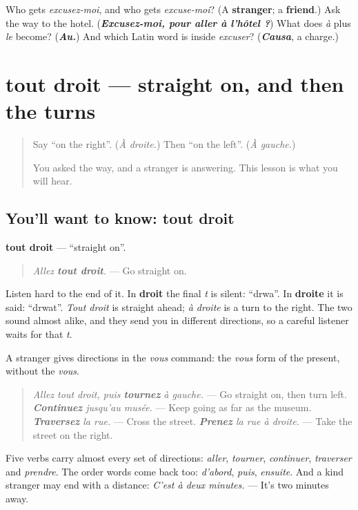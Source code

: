 \begin{tcolorbox}[breakable,colback=teal!4,colframe=teal!35!black,title={Before you move on}]
Who gets \emph{excusez-moi}, and who gets \emph{excuse-moi}? (A \textbf{stranger}; a \textbf{friend}.) Ask the way to the hotel. (\emph{\textbf{Excusez-moi, pour aller à l'hôtel ?}}) What does \emph{à} plus \emph{le} become? (\emph{\textbf{Au.}}) And which Latin word is inside \emph{excuser}? (\emph{\textbf{Causa}}, a charge.)
\end{tcolorbox}
\section[tout droit]{tout droit — straight on, and then the turns}

\label{lesson:FR-C262-tout-droit}



\begin{quote}
Say \textquotedblleft{}on the right\textquotedblright{}. (\emph{À droite.}) Then \textquotedblleft{}on the left\textquotedblright{}. (\emph{À gauche.})

You asked the way, and a stranger is answering. This lesson is what you will hear.
\end{quote}

\subsection*{You'll want to know: tout droit}
\textbf{tout droit} — \textquotedblleft{}straight on\textquotedblright{}.

\begin{quote}
\emph{Allez \textbf{tout droit}.} — Go straight on.
\end{quote}

Listen hard to the end of it. In \textbf{droit} the final \emph{t} is silent: \textquotedblleft{}drwa\textquotedblright{}. In \textbf{droite} it is said: \textquotedblleft{}drwat\textquotedblright{}. \emph{Tout droit} is straight ahead; \emph{à droite} is a turn to the right. The two sound almost alike, and they send you in different directions, so a careful listener waits for that \emph{t}.

\begin{grammarlens}[title={Grammar Lens: directions, as commands}]
A stranger gives directions in the \emph{vous} command: the \emph{vous} form of the present, without the \emph{vous}.

\begin{quote}
\emph{Allez tout droit, puis \textbf{tournez} à gauche.} — Go straight on, then turn left. \emph{\textbf{Continuez} jusqu'au musée.} — Keep going as far as the museum. \emph{\textbf{Traversez} la rue.} — Cross the street. \emph{\textbf{Prenez} la rue à droite.} — Take the street on the right.
\end{quote}

Five verbs carry almost every set of directions: \emph{aller}, \emph{tourner}, \emph{continuer}, \emph{traverser} and \emph{prendre}. The order words come back too: \emph{d'abord}, \emph{puis}, \emph{ensuite}. And a kind stranger may end with a distance: \emph{C'est à deux minutes.} — It's two minutes away.
\end{grammarlens}

